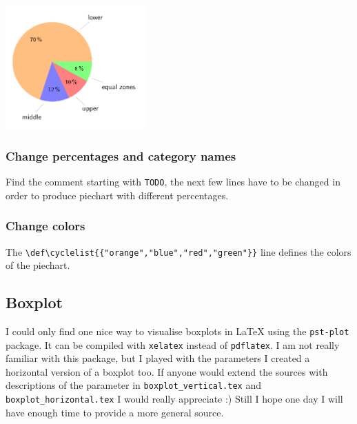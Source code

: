 \documentclass[a4paper]{article}
\begin{document}
	\begin{center}
		\includegraphics[width=0.4\textwidth]{pie1}
				
		
	\end{center}
	
	
	\subsubsection*{Change percentages and category names}
	 Find the comment starting with \texttt{TODO}, the next few lines have to be changed in order to 
	 produce piechart with different percentages.
		
	\subsubsection*{Change colors}
	The \verb.\def\cyclelist{{"orange","blue","red","green"}}. line defines the colors of the piechart. 
	
	
	\subsection{Boxplot}
	I could only find one nice way to visualise boxplots in \LaTeX{} using the \texttt{pst-plot} package. It can be compiled with \texttt{xelatex} instead of \texttt{pdflatex}. I am not really familiar with this package, but I played with the parameters I created a horizontal version of a boxplot too. If anyone would extend the sources with descriptions of the parameter in \texttt{boxplot\_vertical.tex} and \texttt{boxplot\_horizontal.tex} I would really appreciate :) Still I hope one day I will have enough time to provide a more general source.
	
\end{document}

